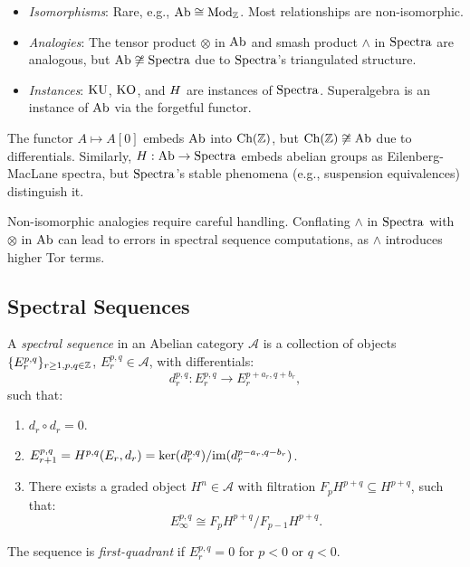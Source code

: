 \documentclass{article}
\begin{document}
\begin{itemize}
    \item \emph{Isomorphisms}: Rare, e.g., \( \text{Ab} \cong \text{Mod}_{\mathbb{Z}} \). Most relationships are non-isomorphic.
    \item \emph{Analogies}: The tensor product \( \otimes \) in \( \text{Ab} \) and smash product \( \wedge \) in \( \text{Spectra} \) are analogous, but \( \text{Ab} \not\cong \text{Spectra} \) due to \( \text{Spectra} \)’s triangulated structure.
    \item \emph{Instances}: \( \text{KU} \), \( \text{KO} \), and \( H \) are instances of \( \text{Spectra} \). Superalgebra is an instance of \( \text{Ab} \) via the forgetful functor.
\end{itemize}

\begin{example}
The functor \( A \mapsto A[0] \) embeds \( \text{Ab} \) into \( \text{Ch}(\mathbb{Z}) \), but \( \text{Ch}(\mathbb{Z}) \not\cong \text{Ab} \) due to differentials. Similarly, \( H: \text{Ab} \to \text{Spectra} \) embeds abelian groups as Eilenberg-MacLane spectra, but \( \text{Spectra} \)’s stable phenomena (e.g., suspension equivalences) distinguish it.
\end{example}

\begin{remark}
Non-isomorphic analogies require careful handling. Conflating \( \wedge \) in \( \text{Spectra} \) with \( \otimes \) in \( \text{Ab} \) can lead to errors in spectral sequence computations, as \( \wedge \) introduces higher Tor terms.
\end{remark}

\newpage
\subsection{Spectral Sequences}

\begin{definition}
A \emph{spectral sequence} in an Abelian category \( \mathcal{A} \) is a collection of objects \( \{ E_r^{p,q} \}_{r \geq 1, p, q \in \mathbb{Z}} \), \( E_r^{p,q} \in \mathcal{A} \), with differentials:
\[
d_r^{p,q}: E_r^{p,q} \to E_r^{p + a_r, q + b_r},
\]
such that:
\begin{enumerate}
    \item \( d_r \circ d_r = 0 \).
    \item \( E_{r+1}^{p,q} = H^{p,q}(E_r, d_r) = \ker(d_r^{p,q}) / \text{im}(d_r^{p - a_r, q - b_r}) \).
    \item There exists a graded object \( H^n \in \mathcal{A} \) with filtration \( F_p H^{p+q} \subseteq H^{p+q} \), such that:
    \[
    E_\infty^{p,q} \cong F_p H^{p+q} / F_{p-1} H^{p+q}.
    \]
\end{enumerate}
The sequence is \emph{first-quadrant} if \( E_r^{p,q} = 0 \) for \( p < 0 \) or \( q < 0 \).
\end{definition}
\end{document}
